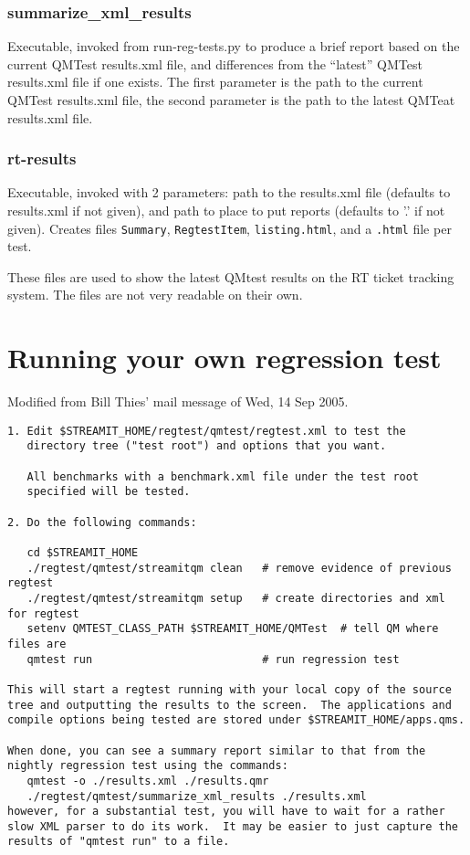 \documentclass[11pt]{article}
\begin{document}
\subsubsection{summarize_xml_results}
Executable, invoked from run-reg-tests.py to produce a brief report based on
the current QMTest results.xml file, and differences from the ``latest''
QMTest results.xml file if one exists. The first parameter is the path to
the current QMTest results.xml file, the second parameter is the path to
the latest QMTeat results.xml file.

\subsubsection{rt-results}
Executable, invoked with 2 parameters: path to the results.xml file (defaults
to results.xml if not given), 
and path to place to put reports (defaults to '.' if not given).
Creates files 
{\tt Summary}, 
{\tt RegtestItem}, 
{\tt listing.html},
and a {\tt .html} file per test.

These files are used to show the latest QMtest results on the 
RT ticket tracking system. 
 The files are not very readable on their own.


\section{Running your own regression test}

Modified from Bill Thies' mail message of  Wed, 14 Sep 2005.
\begin{verbatim}
1. Edit $STREAMIT_HOME/regtest/qmtest/regtest.xml to test the
   directory tree ("test root") and options that you want.

   All benchmarks with a benchmark.xml file under the test root
   specified will be tested.

2. Do the following commands:

   cd $STREAMIT_HOME
   ./regtest/qmtest/streamitqm clean   # remove evidence of previous regtest
   ./regtest/qmtest/streamitqm setup   # create directories and xml for regtest
   setenv QMTEST_CLASS_PATH $STREAMIT_HOME/QMTest  # tell QM where files are
   qmtest run                          # run regression test

This will start a regtest running with your local copy of the source
tree and outputting the results to the screen.  The applications and
compile options being tested are stored under $STREAMIT_HOME/apps.qms.

When done, you can see a summary report similar to that from the
nightly regression test using the commands:
   qmtest -o ./results.xml ./results.qmr 
   ./regtest/qmtest/summarize_xml_results ./results.xml
however, for a substantial test, you will have to wait for a rather
slow XML parser to do its work.  It may be easier to just capture the
results of "qmtest run" to a file.
\end{verbatim}
\end{document}
